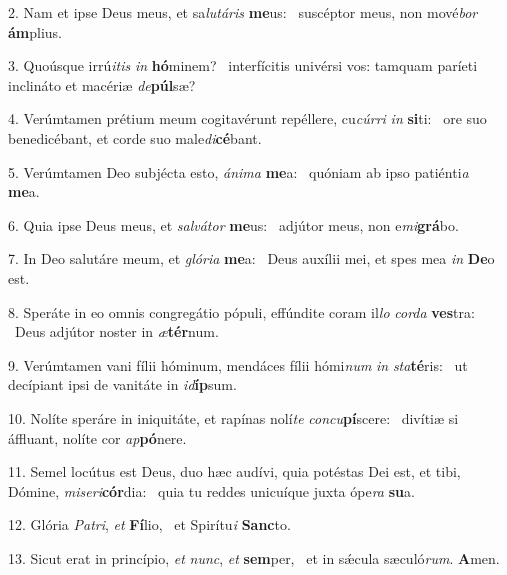 2. Nam et ipse Deus meus, et sa\textit{lu}\textit{tá}\textit{ris} \textbf{me}us: \ast\  suscéptor meus, non mové\textit{bor} \textbf{ám}plius.\

3. Quoúsque irrú\textit{i}\textit{tis} \textit{in} \textbf{hó}minem? \ast\  interfícitis univérsi vos: tamquam paríeti inclináto et macériæ \textit{de}\textbf{púl}sæ?\

4. Verúmtamen prétium meum cogitavérunt repéllere, cu\textit{cúr}\textit{ri} \textit{in} \textbf{si}ti: \ast\  ore suo benedicébant, et corde suo male\textit{di}\textbf{cé}bant.\

5. Verúmtamen Deo subjécta esto, \textit{á}\textit{ni}\textit{ma} \textbf{me}a: \ast\  quóniam ab ipso patiénti\textit{a} \textbf{me}a.\

6. Quia ipse Deus meus, et \textit{sal}\textit{vá}\textit{tor} \textbf{me}us: \ast\  adjútor meus, non e\textit{mi}\textbf{grá}bo.\

7. In Deo salutáre meum, et \textit{gló}\textit{ri}\textit{a} \textbf{me}a: \ast\  Deus auxílii mei, et spes mea \textit{in} \textbf{De}o est.\

8. Speráte in eo omnis congregátio pópuli, effúndite coram il\textit{lo} \textit{cor}\textit{da} \textbf{ves}tra: \ast\  Deus adjútor noster in \textit{æ}\textbf{tér}num.\

9. Verúmtamen vani fílii hóminum, mendáces fílii hómi\textit{num} \textit{in} \textit{sta}\textbf{té}ris: \ast\  ut decípiant ipsi de vanitáte in \textit{id}\textbf{íp}sum.\

10. Nolíte speráre in iniquitáte, et rapínas nolí\textit{te} \textit{con}\textit{cu}\textbf{pí}scere: \ast\  divítiæ si áffluant, nolíte cor \textit{ap}\textbf{pó}nere.\

11. Semel locútus est Deus, duo hæc audívi, quia potéstas Dei est, et tibi, Dómine, \textit{mi}\textit{se}\textit{ri}\textbf{cór}dia: \ast\  quia tu reddes unicuíque juxta ópe\textit{ra} \textbf{su}a.\

12. Glória \textit{Pa}\textit{tri}, \textit{et} \textbf{Fí}lio, \ast\  et Spirítu\textit{i} \textbf{Sanc}to.\

13. Sicut erat in princípio, \textit{et} \textit{nunc}, \textit{et} \textbf{sem}per, \ast\  et in sǽcula sæculó\textit{rum}. \textbf{A}men.\

